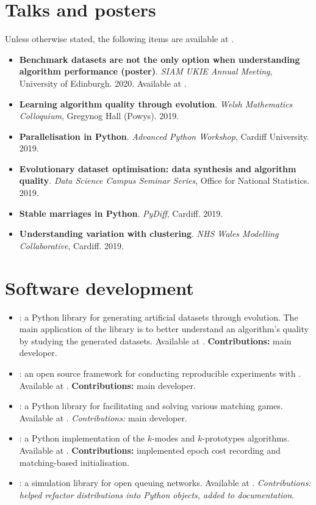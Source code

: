\section*{Talks and posters}

Unless otherwise stated, the following items are available at
.

\begin{itemize}
    \item \textbf{Benchmark datasets are not the only option when understanding
        algorithm performance (poster)}. \emph{SIAM UKIE Annual Meeting},
        University of Edinburgh. 2020. Available at
        . 
    \item \textbf{Learning algorithm quality through evolution}. \emph{Welsh
        Mathematics Colloquium}, Gregynog Hall (Powys). 2019.
    \item \textbf{Parallelisation in Python}. \emph{Advanced Python Workshop},
        Cardiff University. 2019.
    \item \textbf{Evolutionary dataset optimisation: data synthesis and
        algorithm quality}. \emph{Data Science Campus Seminar Series}, Office
        for National Statistics. 2019.
    \item \textbf{Stable marriages in Python}. \emph{PyDiff}, Cardiff. 2019.
    \item \textbf{Understanding variation with clustering}. \emph{NHS Wales
        Modelling Collaborative}, Cardiff. 2019.
\end{itemize}

\section*{Software development}

\begin{itemize}
    \item \edo: a Python library for generating artificial datasets through
        evolution. The main application of the library is to better understand
        an algorithm's quality by studying the generated datasets. Available
        at . \textbf{Contributions:} main developer.
    \item \edolab: an open source framework for conducting reproducible
        experiments with \edo. Available at .
        \textbf{Contributions:} main developer.
    \item \matching: a Python library for facilitating and solving various
        matching games. Available at .
        \emph{Contributions:} main developer.
    \item \kmodes: a Python implementation of the \(k\)-modes and
        \(k\)-prototypes algorithms. Available at .
        \textbf{Contributions:} implemented epoch cost recording and matching-based
        initialisation.
    \item \ciw: a simulation library for open queuing networks. Available at
        . \emph{Contributions: helped refactor
        distributions into Python objects, added to documentation}.
\end{itemize}
